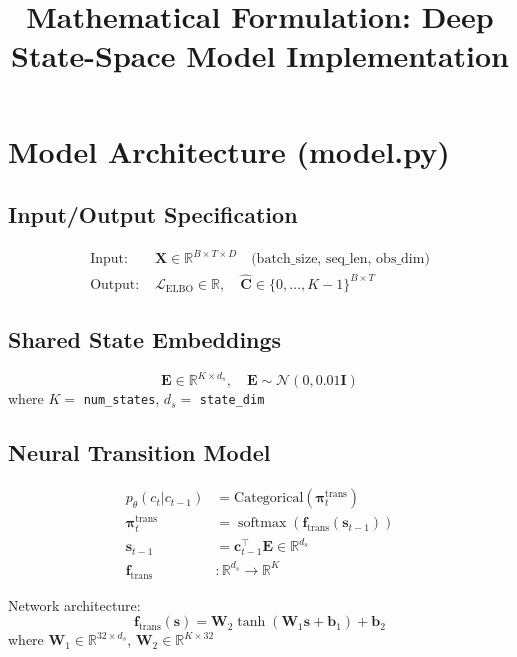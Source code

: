 \documentclass[11pt]{article}
\title{Mathematical Formulation: Deep State-Space Model Implementation}
\date{}
\DeclareMathOperator{\softmax}{softmax}
\begin{document}
\maketitle

\section{Model Architecture (model.py)}

\subsection{Input/Output Specification}
\begin{align}
\text{Input: } &\mathbf{X} \in \mathbb{R}^{B \times T \times D} \quad \text{(batch\_size, seq\_len, obs\_dim)} \\
\text{Output: } &\mathcal{L}_{\text{ELBO}} \in \mathbb{R}, \quad \hat{\mathbf{C}} \in \{0,\ldots,K-1\}^{B \times T}
\end{align}

\subsection{Shared State Embeddings}
\begin{equation}
\mathbf{E} \in \mathbb{R}^{K \times d_s}, \quad \mathbf{E} \sim \mathcal{N}(0, 0.01\mathbf{I})
\end{equation}
where $K = $ \texttt{num\_states}, $d_s = $ \texttt{state\_dim}

\subsection{Neural Transition Model}
\begin{align}
p_\theta(c_t | c_{t-1}) &= \text{Categorical}(\bm{\pi}_t^{\text{trans}}) \\
\bm{\pi}_t^{\text{trans}} &= \softmax(\mathbf{f}_{\text{trans}}(\mathbf{s}_{t-1})) \\
\mathbf{s}_{t-1} &= \mathbf{c}_{t-1}^\top \mathbf{E} \in \mathbb{R}^{d_s} \\
\mathbf{f}_{\text{trans}} &: \mathbb{R}^{d_s} \to \mathbb{R}^K
\end{align}

Network architecture:
\begin{equation}
\mathbf{f}_{\text{trans}}(\mathbf{s}) = \mathbf{W}_2 \tanh(\mathbf{W}_1 \mathbf{s} + \mathbf{b}_1) + \mathbf{b}_2
\end{equation}
where $\mathbf{W}_1 \in \mathbb{R}^{32 \times d_s}$, $\mathbf{W}_2 \in \mathbb{R}^{K \times 32}$
\end{document}

